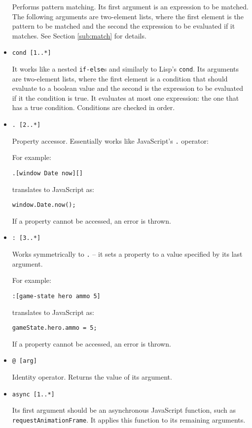 \begin{itemize}
    Performs pattern matching. Its first argument is an expression to be matched. The following arguments are two-element lists, where the first element is the pattern to be matched and the second the expression to be evaluated if it matches. See Section \ref{sub:match} for details.
        
    \item \texttt{cond [1..*]}
    
    It works like a nested \texttt{if-else}s and similarly to Lisp's \texttt{cond}\cite[Section~5.3, Macro~COND]{common_lisp_hyperspec}. Its arguments are two-element lists, where the first element is a condition that should evaluate to a boolean value and the second is the expression to be evaluated if it the condition is true. It evaluates at most one expression: the one that has a true condition. Conditions are checked in order.
    
    \item \texttt{. [2..*]}
    
    Property accessor. Essentially works like JavaScript's \texttt{.} operator\cite{mdn_dot}:
    
    For example:
\begin{lstlisting}
.[window Date now][]
\end{lstlisting}
    
    translates to JavaScript as:
\begin{lstlisting}
window.Date.now();
\end{lstlisting}
    
    If a property cannot be accessed, an error is thrown.
    
    \item \texttt{: [3..*]}
    
    Works symmetrically to \texttt{.} -- it sets a property to a value specified by its last argument.
    
    For example:
\begin{lstlisting}
:[game-state hero ammo 5]
\end{lstlisting}
    
    translates to JavaScript as:
\begin{lstlisting}
gameState.hero.ammo = 5;
\end{lstlisting}
       
    If a property cannot be accessed, an error is thrown.
    
    \item \texttt{@ [arg]}
    
    Identity operator. Returns the value of its argument.
    
    \item \texttt{async [1..*]}
    
    Its first argument should be an asynchronous JavaScript function, such as \texttt{requestAnimationFrame}\cite{mdn_requestanimationframe}. It applies this function to its remaining arguments.
\end{itemize}

